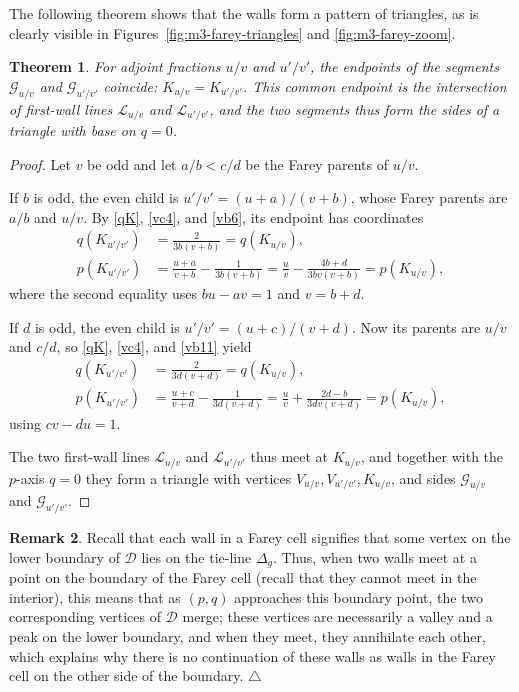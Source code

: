 \documentclass[11pt,reqno,tbtags,a4paper]{amsart}
\numberwithin{equation}{section}
\theoremstyle{plain}%
\newtheorem{theorem}{Theorem}[section]
\theoremstyle{definition}
\newcommand\xqed[1]{%
    \leavevmode\unskip\penalty9999 \hbox{}\nobreak\hfill
    \quad\hbox{#1}}
\newtheorem{remarkqqq}[theorem]{Remark}
\newenvironment{remark}{\begin{remarkqqq}}
  {\xqed{$\triangle$}\end{remarkqqq}}
\theoremstyle{remark}
\newcommand{\refFigs}[1]{Figures~\ref{#1}}
\newcommand\gD{\Delta}
\newcommand\cD{\mathcal D}
\newcommand\LL{{\mathcal L}}
\newcommand\LG{{\mathcal G}} %
\newcommand\uv{_{u/v}}
\newcommand\uvi{_{u'/v'}}
\newcommand\0{{\boldsymbol 0}}
\newcommand\1{{\boldsymbol 1}}
\begin{document}
The following theorem shows that the walls form a pattern of triangles,
as is clearly visible in 
\refFigs{fig:m3-farey-triangles} and \ref{fig:m3-farey-zoom}.

\begin{theorem}\label{ConjFarey+lines}
For adjoint fractions $u/v$ and $u'/v'$, 
the endpoints of the segments $\LG\uv$ and $\LG\uvi$ coincide:
$K_{u/v}=K_{u'/v'}$.
This common endpoint is the intersection of first-wall lines $\LL\uv$ and
$\LL\uvi$, 
and the two segments thus form the sides of a triangle with base on $q=0$.
\end{theorem}

\begin{proof}
Let $v$ be odd and let $a/b<c/d$ be the Farey parents of $u/v$.

If $b$ is odd, the even child is $u'/v'=(u+a)/(v+b)$,
whose Farey parents are $a/b$ and $u/v$.
By \eqref{qK}, \eqref{vc4}, and \eqref{vb6}, its endpoint has coordinates
\begin{align}
 q(K_{u'/v'})&=\frac{2}{3b(v+b)}=q(K_{u/v}),\\
 p(K_{u'/v'})&=\frac{u+a}{v+b}-\frac{1}{3b(v+b)}
 =\frac uv-\frac{4b+d}{3bv(v+b)}
 =p(K_{u/v}),
\end{align}
where the second equality uses $bu-av=1$ and $v=b+d$.
%

If $d$ is odd, the even child is $u'/v'=(u+c)/(v+d)$.
Now its parents are $u/v$ and $c/d$, so
\eqref{qK}, \eqref{vc4}, and \eqref{vb11}  yield
\begin{align}
 q(K_{u'/v'})&=\frac{2}{3d(v+d)}=q(K_{u/v}),\\
 p(K_{u'/v'})&=\frac{u+c}{v+d}-\frac{1}{3d(v+d)}
 =\frac uv+\frac{2d-b}{3dv(v+d)}
 =p(K_{u/v}),
\end{align}
using $cv-du=1$. %

The two first-wall lines  $\LL\uv$ and $\LL\uvi$
thus meet at $K\uv$, and together with the $p$-axis $q=0$ they  form a
triangle with vertices $V\uv,V\uvi,K\uv$, and sides $\LG\uv$ and $\LG\uvi$.
\end{proof}

\begin{remark}
  Recall that each wall in a Farey cell signifies that some vertex on
  the lower boundary of $\cD$ lies on the tie-line $\gD_g$.
Thus, when two walls meet at a point on the boundary of the Farey cell 
(recall that they cannot meet in the interior), this means that as $(p,q)$
approaches this boundary point, the two corresponding vertices of $\cD$ merge;
these vertices are necessarily a valley and a peak on the lower boundary,
and when they meet, they annihilate each other, which explains why there is
no continuation of these walls as walls in the Farey cell on the
other side of the boundary.
\end{remark}
\end{document}
